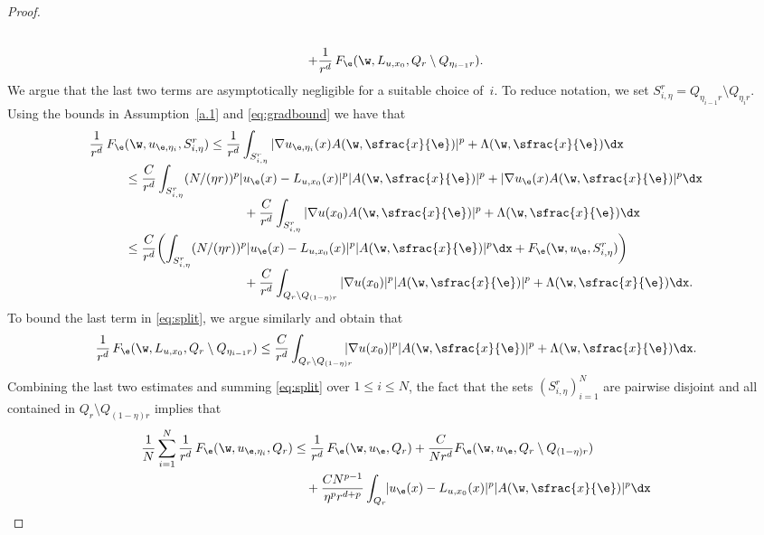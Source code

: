 \begin{proof}
\begin{multline}
\\
+\frac{1}{r^d}\,F_{\e}(\w,L_{u,x_0},Q_{r}\setminus Q_{\eta_{i-1}r}).
\end{multline}
We argue that the last two terms are asymptotically negligible for a suitable choice of~$i$. To reduce notation, we set $S_{i,\eta}^r=Q_{\eta_{i-1}r}\setminus Q_{\eta_i r}$. Using the bounds in Assumption~\ref{a.1} and \eqref{eq:gradbound} we have that
\begin{align*}
\frac{1}{r^d}\,F_{\e}&(\w,u_{\e,\eta_i},S^r_{i,\eta})\leq \frac{1}{r^d}\int_{S^r_{i,\eta}}|\nabla u_{\e,\eta_i}(x)A(\w,\sfrac{x}{\e})|^p+\Lambda(\w,\sfrac{x}{\e})\dx
\\[-3pt]
&\leq \frac{C}{r^d}\int_{S^r_{i,\eta}}(N/(\eta r))^{p} |u_{\e}(x)-L_{u,x_0}(x)|^p|A(\w,\sfrac{x}{\e})|^p+|\nabla u_{\e}(x)A(\w,\sfrac{x}{\e})|^p\dx
\\[-3pt]
&\hspace*{3.3cm}+\frac{C}{r^d}\int_{S^r_{i,\eta}}|\nabla u(x_0)A(\w,\sfrac{x}{\e})|^p+\Lambda(\w,\sfrac{x}{\e})\dx
\\[-3pt]
&\leq \frac{C}{r^d} \biggl(\int_{S_{i,\eta}^r}(N/(\eta r))^{p} |u_{\e}(x)-L_{u,x_0}(x)|^p|A(\w,\sfrac{x}{\e})|^p\dx+F_{\e}(\w,u_{\e},S_{i,\eta}^r)\biggr)
\\[-3pt]
&\hspace*{3.3cm}+\frac{C}{r^d}\int_{Q_r\setminus Q_{(1-\eta)r}}|\nabla u(x_0)|^p|A(\w,\sfrac{x}{\e})|^p+\Lambda(\w,\sfrac{x}{\e})\dx.
\end{align*}
To bound the last term in \eqref{eq:split}, we argue similarly and obtain that
\begin{equation*}
\frac{1}{r^d}\,F_{\e}(\w,L_{u,x_0},Q_{r}\setminus Q_{\eta_{i-1}r})\leq \frac{C}{r^d}\int_{Q_r\setminus Q_{(1-\eta) r}}\hspace*{-3mm}|\nabla u(x_0)|^p|A(\w,\sfrac{x}{\e})|^p+\Lambda(\w,\sfrac{x}{\e})\dx.
\end{equation*}
Combining the last two estimates and summing \eqref{eq:split} over $1\leq i\leq N$, the fact that the sets $(S^r_{i,\eta})_{i=1}^N$ are pairwise disjoint and all contained in $Q_r\setminus Q_{(1-\eta)r}$ implies that
\begin{align*}
\frac{1}{N}\sum_{i=1}^N\frac{1}{r^d}\,F_{\e}(\w,u_{\e,\eta_i},Q_r)&\leq \frac{1}{r^d}\,F_{\e}(\w,u_{\e},Q_r)+\frac{C}{Nr^d} F_{\e}(\w,u_{\e},Q_r\setminus Q_{(1-\eta)r})
\\
&\quad+\frac{CN^{p-1}}{\eta^p r^{d+p}}\int_{Q_r}\hspace*{-1mm}|u_{\e}(x)-L_{u,x_0}(x)|^p|A(\w,\sfrac{x}{\e})|^p\dx
\\

\end{align*}
\end{proof}
